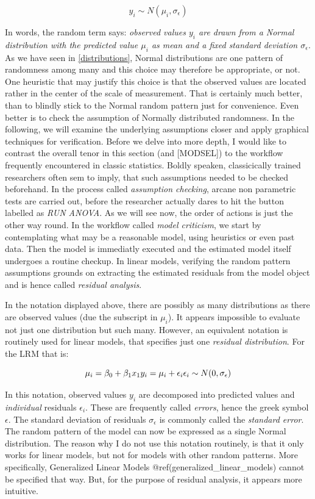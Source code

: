 \documentclass[]{svmono}
\theoremstyle{definition}
\theoremstyle{definition}
\theoremstyle{definition}
\theoremstyle{remark}
\begin{document}
\[y_i \sim N(\mu_i, \sigma_\epsilon)\]

In words, the random term says: \emph{observed values \(y_i\) are drawn
from a Normal distribution with the predicted value \(\mu_i\) as mean
and a fixed standard deviation \(\sigma_\epsilon\)}. As we have seen in
\ref{distributions}, Normal distributions are one pattern of randomness
among many and this choice may therefore be appropriate, or not. One
heuristic that may justify this choice is that the observed values are
located rather in the center of the scale of measurement. That is
certainly much better, than to blindly stick to the Normal random
pattern just for convenience. Even better is to check the assumption of
Normally distributed randomness. In the following, we will examine the
underlying assumptions closer and apply graphical techniques for
verification. Before we delve into more depth, I would like to contrast
the overall tenor in this section (and {[}MODSEL{]}) to the workflow
frequently encountered in classic statistics. Boldly speaken,
classicically trained researchers often sem to imply, that such
assumptions needed to be checked beforehand. In the process called
\emph{assumption checking}, arcane non parametric tests are carried out,
before the researcher actually dares to hit the button labelled as
\emph{RUN ANOVA}. As we will see now, the order of actions is just the
other way round. In the workflow called \emph{model criticism}, we start
by contemplating what may be a reasonable model, using heuristics or
even past data. Then the model is immediatly executed and the estimated
model itself undergoes a routine checkup. In linear models, verifying
the random pattern assumptions grounds on extracting the estimated
residuals from the model object and is hence called \emph{residual
analysis}.

In the notation displayed above, there are possibly as many
distributions as there are observed values (due the subscript in
\(\mu_i\)). It appears impossible to evaluate not just one distribution
but such many. However, an equivalent notation is routinely used for
linear models, that specifies just one \emph{residual distribution}. For
the LRM that is:

\[
\mu_i = \beta_0 + \beta_1x_1\\
y_i = \mu_i + \epsilon_i\\
\epsilon_i \sim N(0, \sigma_\epsilon)
\]

In this notation, observed values \(y_i\) are decomposed into predicted
values and \emph{individual} residuals \(\epsilon_i\). These are
frequently called \emph{errors}, hence the greek symbol \(\epsilon\).
The standard deviation of residuals \(\sigma_\epsilon\) is commonly
called the \emph{standard error}. The random pattern of the model can
now be expressed as a single Normal distribution. The reason why I do
not use this notation routinely, is that it only works for linear
models, but not for models with other random patterns. More
specifically, Generalized Linear Models
@ref(generalized\_linear\_models) cannot be specified that way. But, for
the purpose of residual analysis, it appears more intuitive.
\end{document}
